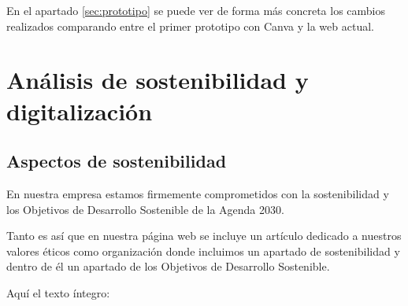\documentclass[11.5pt]{article}
\begin{document}
	En el apartado \ref{sec:prototipo} se puede ver de forma más concreta los cambios realizados comparando entre el primer
	prototipo con Canva y la web actual.
	
	\section{Análisis de sostenibilidad y digitalización}
	
	\subsection{Aspectos de sostenibilidad}
	
	En nuestra empresa estamos firmemente comprometidos con la sostenibilidad y los Objetivos de Desarrollo
	Sostenible de la Agenda 2030.
	
	Tanto es así que en nuestra página web se incluye un artículo dedicado a nuestros valores éticos como
	organización donde incluimos un apartado de sostenibilidad y dentro de él un apartado de los Objetivos de
	Desarrollo Sostenible.
	
	Aquí el texto íntegro:
	
\end{document}
